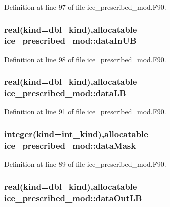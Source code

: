 Definition at line 97 of file ice\_\-prescribed\_\-mod.F90.\hypertarget{namespaceice__prescribed__mod_a07649c4c91bccc292f9aa60851ab2a14}{
\subsubsection[{dataInUB}]{\setlength{\rightskip}{0pt plus 5cm}real(kind=dbl\_\-kind),allocatable {\bf ice\_\-prescribed\_\-mod::dataInUB}}}
\label{namespaceice__prescribed__mod_a07649c4c91bccc292f9aa60851ab2a14}


Definition at line 98 of file ice\_\-prescribed\_\-mod.F90.\hypertarget{namespaceice__prescribed__mod_a74430be62d3958af3edd6b7254027d08}{
\subsubsection[{dataLB}]{\setlength{\rightskip}{0pt plus 5cm}real(kind=dbl\_\-kind),allocatable {\bf ice\_\-prescribed\_\-mod::dataLB}}}
\label{namespaceice__prescribed__mod_a74430be62d3958af3edd6b7254027d08}


Definition at line 91 of file ice\_\-prescribed\_\-mod.F90.\hypertarget{namespaceice__prescribed__mod_a4d4897310d6673a94b06d49fd6adfbcc}{
\subsubsection[{dataMask}]{\setlength{\rightskip}{0pt plus 5cm}integer(kind=int\_\-kind),allocatable {\bf ice\_\-prescribed\_\-mod::dataMask}}}
\label{namespaceice__prescribed__mod_a4d4897310d6673a94b06d49fd6adfbcc}


Definition at line 89 of file ice\_\-prescribed\_\-mod.F90.\hypertarget{namespaceice__prescribed__mod_a88edf4fbb0dc86b082ddf6a6c48d393a}{
\subsubsection[{dataOutLB}]{\setlength{\rightskip}{0pt plus 5cm}real(kind=dbl\_\-kind),allocatable {\bf ice\_\-prescribed\_\-mod::dataOutLB}}}
\label{namespaceice__prescribed__mod_a88edf4fbb0dc86b082ddf6a6c48d393a}


